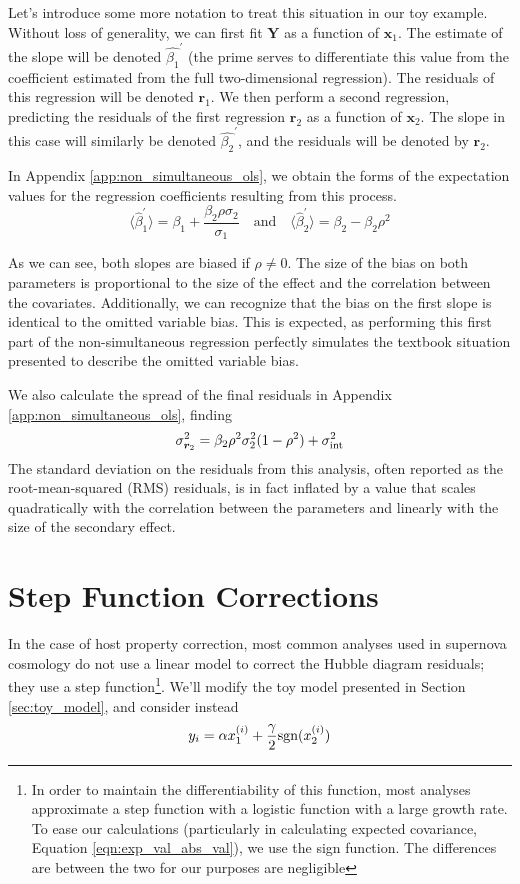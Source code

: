 Let's introduce some more notation to treat this situation in our toy example. Without loss of generality, we can first fit $\bm{Y}$ as a function of $\bm{x}_1$. The estimate of the slope will be denoted $\hat{\beta_1}^\prime$ (the prime serves to differentiate this value from the coefficient estimated from the full two-dimensional regression). The residuals of this regression will be denoted $\bm{r}_1$. We then perform a second regression, predicting the residuals of the first regression $\bm{r}_2$ as a function of $\bm{x}_2$. The slope in this case will similarly be denoted $\hat{\beta_2}^\prime$, and the residuals will be denoted by $\bm{r}_2$.

In Appendix \ref{app:non_simultaneous_ols}, we obtain the forms of the expectation values for the regression coefficients resulting from this process.
\begin{equation*}
    \langle\hat{\beta}_1^\prime\rangle = \beta_1 + \frac{\beta_2\rho\sigma_2}{\sigma_1}\quad\text{and}\quad\langle\hat{\beta}_2^\prime\rangle = \beta_2 - \beta_2\rho^2
\end{equation*}

As we can see, both slopes are biased if $\rho \neq 0$. The size of the bias on both parameters is proportional to the size of the effect and the correlation between the covariates. Additionally, we can recognize that the bias on the first slope is identical to the omitted variable bias. This is expected, as performing this first part of the non-simultaneous regression perfectly simulates the textbook situation presented to describe the omitted variable bias.

We also calculate the spread of the final residuals in Appendix \ref{app:non_simultaneous_ols}, finding
\begin{equation}
    \sigma_{\bm{r}_2}^2 = \beta_2\rho^2\sigma_2^2(1-\rho^2) + \sigma_{\text{int}}^2
\end{equation}
The standard deviation on the residuals from this analysis, often reported as the root-mean-squared (RMS) residuals, is in fact inflated by a value that scales quadratically with the correlation between the parameters and linearly with the size of the secondary effect.
\section{Step Function Corrections}
\label{sec:add_step}
In the case of host property correction, most common analyses used in supernova cosmology do not use a linear model to correct the Hubble diagram residuals; they use a step function\footnote{In order to maintain the differentiability of this function, most analyses approximate a step function with a logistic function with a large growth rate. To ease our calculations (particularly in calculating expected covariance, Equation \ref{eqn:exp_val_abs_val}), we use the sign function. The differences are between the two for our purposes are negligible}. We'll modify the toy model presented in Section \ref{sec:toy_model}, and consider instead
\begin{equation}
    y_i = \alpha x_1^{(i)} + \frac{\gamma}{2}\text{sgn}(x_2^{(i)})
\label{eqn:linear_and_step}
\end{equation}

